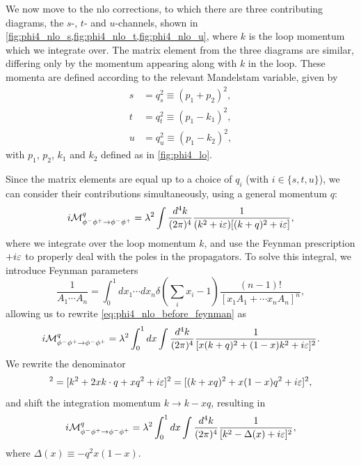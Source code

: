 We now move to the \gls{nlo} corrections, to which there are three contributing diagrams, the $s$-, $t$- and $u$-channels, shown in \cref{fig:phi4_nlo_s,fig:phi4_nlo_t,fig:phi4_nlo_u}, where $k$ is the loop momentum which we integrate over.
The matrix element from the three diagrams are similar, differing only by the momentum appearing along with $k$ in the loop. These momenta are defined according to the relevant Mandelstam variable, given by
\begin{align}
    s &= q_s^2 \equiv (p_1+p_2)^2, \\
    t &= q_t^2 \equiv (p_1-k_1)^2, \\
    u &= q_u^2 \equiv (p_1-k_2)^2,
\end{align}
with $p_1$, $p_2$, $k_1$ and $k_2$ defined as in \cref{fig:phi4_lo}.

Since the matrix elements are equal up to a choice of $q_i$ (with $i\in\{s,t,u\}$), we can consider their contributions simultaneously, using a general momentum $q$:
\begin{equation}\label{eq:phi4_nlo_before_feynman}
    i\mathcal{M}_{\phi^-\phi^+\to\phi^-\phi^+}^q = \lambda^2 \int\frac{d^4k}{(2\pi)^4} \frac{1}{(k^2+i\varepsilon)[(k+q)^2+i\varepsilon]},
\end{equation}
where we integrate over the loop momentum $k$, and use the Feynman prescription $+i\varepsilon$ to properly deal with the poles in the propagators.
To solve this integral, we introduce Feynman parameters~\cite{Peskin:1995ev}
\begin{equation}
    \frac{1}{A_1\cdots A_n} = \int_0^1dx_1\cdots dx_n \delta(\sum_i x_i - 1) \frac{(n-1)!}{[x_1A_1+\cdots x_nA_n]^n},
\end{equation}
allowing us to rewrite \cref{eq:phi4_nlo_before_feynman} as
\begin{equation}
    i\mathcal{M}_{\phi^-\phi^+\to\phi^-\phi^+}^q = \lambda^2 \int_0^1 dx \int\frac{d^4k}{(2\pi)^4} \frac{1}{[x(k+q)^2 + (1-x)k^2 + i\varepsilon]^2}.
\end{equation}
We rewrite the denominator
\begin{equation}
    [x(k+q)^2+(1-x)k^2+i\eps]^2 = [k^2 + 2xk\cdot q + xq^2 + i\eps]^2 = [(k+xq)^2 + x(1-x)q^2 + i\eps]^2,
\end{equation}
and shift the integration momentum $k \to k-xq$, resulting in
\begin{equation}\label{eq:phi4_nlo_before_wick}
    i\mathcal{M}_{\phi^-\phi^+\to\phi^-\phi^+}^q = \lambda^2 \int_0^1 dx \int\frac{d^4k}{(2\pi)^4} \frac{1}{[k^2 - \Delta(x) + i\varepsilon]^2},
\end{equation}
where $\Delta(x) \equiv -q^2x(1-x)$.

